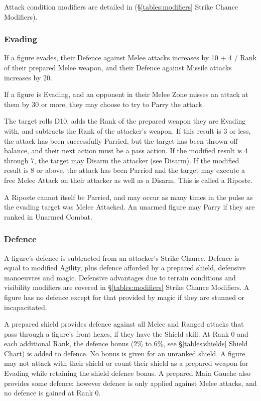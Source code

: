 \begin{multicols*}{3}
Attack condition modifiers are detailed in (\S \ref{tables:modifiers}
Strike Chance Modifiers).

\subsubsection{Evading}

If a figure evades, their Defence against Melee attacks increases by
10 + 4 / Rank of their prepared Melee weapon, and their Defence
against Missile attacks increases by 20.

If a figure is Evading, and an opponent in their Melee Zone misses an
attack at them by 30 or more, they may choose to try to Parry the
attack.

The target rolls D10, adds the Rank of the prepared weapon they are
Evading with, and subtracts the Rank of the attacker's weapon. If this
result is 3 or less, the attack has been successfully Parried, but the
target has been thrown off balance, and their next action must be a
pass action. If the modified result is 4 through 7, the target may
Disarm the attacker (see Disarm). If the modified result is 8
or above, the attack has been Parried and the target may execute a
free Melee Attack on their attacker as well as a Disarm. This is
called a Riposte.

A Riposte cannot itself be Parried, and may occur as many times in the
pulse as the evading target was Melee Attacked. An unarmed figure may
Parry if they are ranked in Unarmed Combat.

\subsubsection{Defence}

A figure's defence is subtracted from an attacker's Strike
Chance. Defence is equal to modified Agility, plus defence afforded by
a prepared shield, defensive manoeuvres and magic. Defensive
advantages due to terrain conditions and visibility modifiers are
covered in \S \ref{tables:modifiers} Strike Chance Modifiers. A figure
has no defence except for that provided by magic if they are stunned
or incapacitated.

A prepared shield provides defence against all Melee and Ranged
attacks that pass through a figure's front hexes, if they have the
Shield skill. At Rank 0 and each additional Rank, the defence bonus
(2\% to 6\%, see \S \ref{tables:shields} Shield Chart) is added to
defence. No bonus is given for an unranked shield. A figure may not
attack with their shield or count their shield as a prepared weapon
for Evading while retaining the shield defence bonus. A prepared Main
Gauche also provides some defence; however defence is only applied
against Melee attacks, and no defence is gained at Rank 0.


\end{multicols*}
